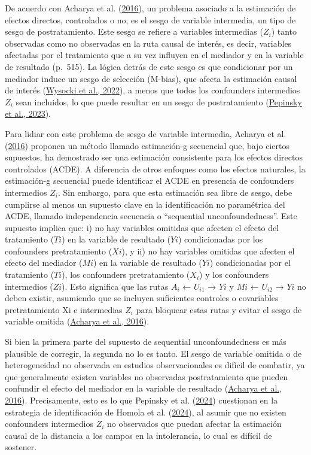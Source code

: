 \documentclass[
  12pt,
  a4paper,
]{article}
\begin{document}
De acuerdo con Acharya et al. (\protect\hyperlink{ref-acharya_explaining_2016}{2016}), un problema asociado a la estimación de efectos directos, controlados o no, es el sesgo de variable intermedia, un tipo de sesgo de postratamiento. Este sesgo se refiere a variables intermedias (\(Z_i\)) tanto observadas como no observadas en la ruta causal de interés, es decir, variables afectadas por el tratamiento que a su vez influyen en el mediador y en la variable de resultado (p.~515). La lógica detrás de este sesgo es que condicionar por un mediador induce un sesgo de selección (M-bias), que afecta la estimación causal de interés (\protect\hyperlink{ref-wysocki_statistical_2022}{Wysocki et al., 2022}), a menos que todos los confounders intermedios \(Z_i\) sean incluidos, lo que puede resultar en un sesgo de postratamiento (\protect\hyperlink{ref-pepinsky_modeling_2023}{Pepinsky et al., 2023}).

Para lidiar con este problema de sesgo de variable intermedia, Acharya et al. (\protect\hyperlink{ref-acharya_explaining_2016}{2016}) proponen un método llamado estimación-g secuencial que, bajo ciertos supuestos, ha demostrado ser una estimación consistente para los efectos directos controlados (ACDE). A diferencia de otros enfoques como los efectos naturales, la estimación-g secuencial puede identificar el ACDE en presencia de confounders intermedios \(Z_i\). Sin embargo, para que esta estimación sea libre de sesgo, debe cumplirse al menos un supuesto clave en la identificación no paramétrica del ACDE, llamado independencia secuencia o ``sequential unconfoundedness''. Este supuesto implica que: i) no hay variables omitidas que afecten el efecto del tratamiento (\(Ti\)) en la variable de resultado (\(Yi\)) condicionadas por los confounders pretratamiento (\(Xi\)), y ii) no hay variables omitidas que afecten el efecto del mediador (\(Mi\)) en la variable de resultado (\(Yi\)) condicionadas por el tratamiento (\(Ti\)), los confounders pretratamiento (\(X_i\)) y los confounders intermedios (\(Zi\)). Esto significa que las rutas \(A_i\) ← \(U_{i1}\) → \(Yi\) y \(Mi\) ← \(U_{i2}\) → \(Yi\) no deben existir, asumiendo que se incluyen suficientes controles o covariables pretratamiento Xi e intermedias \(Z_i\) para bloquear estas rutas y evitar el sesgo de variable omitida (\protect\hyperlink{ref-acharya_explaining_2016}{Acharya et al., 2016}).

Si bien la primera parte del supuesto de sequential unconfoundedness es más plausible de corregir, la segunda no lo es tanto. El sesgo de variable omitida o de heterogeneidad no observada en estudios observacionales es difícil de combatir, ya que generalmente existen variables no observadas postratamiento que pueden confundir el efecto del mediador en la variable de resultado (\protect\hyperlink{ref-acharya_explaining_2016}{Acharya et al., 2016}). Precisamente, esto es lo que Pepinsky et al. (\protect\hyperlink{ref-pepinsky_causation_2024}{2024}) cuestionan en la estrategia de identificación de Homola et al. (\protect\hyperlink{ref-homola_fixed_2024}{2024}), al asumir que no existen confounders intermedios \(Z_i\) no observados que puedan afectar la estimación causal de la distancia a los campos en la intolerancia, lo cual es difícil de sostener.
\end{document}
